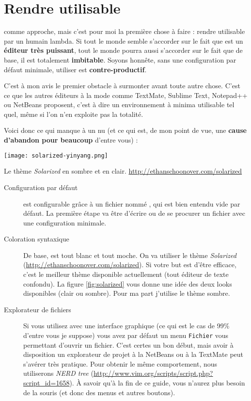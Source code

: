 \chapter{Rendre \vim utilisable}

 comme approche, mais c'est pour moi la première chose à faire : rendre \vim utilisable par un humain lambda. Si tout le monde semble s'accorder sur le fait que \vim est un \textbf{éditeur très puissant}, tout le monde pourra aussi s'accorder sur le fait que de base, il est totalement \textbf{imbitable}. Soyons honnête, sans une configuration par défaut minimale, utiliser \vim est \textbf{contre-productif}. 

C'est à mon avis le premier obstacle à surmonter avant toute autre chose. C'est ce que les autres éditeurs \og à la mode \fg{} comme TextMate, Sublime Text, Notepad++ ou NetBeans proposent, c'est à dire un environnement à minima utilisable tel quel, même si l'on n'en exploite pas la totalité.

Voici donc ce qui manque à un \vim nu (et ce qui est, de mon point de vue, une \textbf{cause d'abandon pour beaucoup} d'entre vous) :

\begin{marginfigure}%
  \texttt{[image: solarized-yinyang.png]}
  \caption{Le thème \emph{Solarized} en sombre et en clair. \url{http://ethanschoonover.com/solarized}}
  \label{fig:solarized}
\end{marginfigure}

\begin{description}
    \item[Configuration par défaut] \vim est configurable grâce à un fichier nommé \vimrc, qui est bien entendu vide par défaut. La première étape va être d'écrire ou de se procurer un fichier \vimrc avec une configuration minimale.
    \item[Coloration syntaxique] De base, \vim est tout blanc et tout moche. On va utiliser le thème \emph{Solarized} (\url{http://ethanschoonover.com/solarized}). Si votre but est d'être efficace, c'est le meilleur thème disponible actuellement (tout éditeur de texte confondu). La figure \ref{fig:solarized} vous donne une idée des deux looks disponibles (clair ou sombre). Pour ma part j'utilise le thème sombre.
    \item[Explorateur de fichiers] Si vous utilisez \vim avec une interface graphique (ce qui est le cas de 99\% d'entre vous je suppose) vous avez par défaut un menu \Verb|Fichier| vous permettant d'ouvrir un fichier. C'est certes un bon début, mais avoir à disposition un explorateur de projet à la NetBeans ou à la TextMate peut s'avérer très pratique. Pour obtenir le même comportement, nous utiliserons \emph{NERD tree} (\url{http://www.vim.org/scripts/script.php?script_id=1658}). À savoir qu'à la fin de ce guide, vous n'aurez plus besoin de la souris (et donc des menus et autres boutons).
\end{description}

